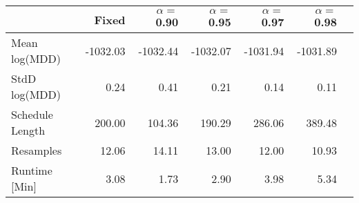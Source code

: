 \begin{tabular} {lrrrrrr} 
 \hline \hline 
&Fixed&$\alpha = $0.90&$\alpha = $0.95&$\alpha = $0.97&$\alpha = $0.98\\ 
 \hline 
Mean log(MDD)&-1032.03&-1032.44&-1032.07&-1031.94&-1031.89\\ 
StdD log(MDD)&0.24&0.41&0.21&0.14&0.11\\ 
Schedule Length&200.00&104.36&190.29&286.06&389.48\\ 
Resamples&12.06&14.11&13.00&12.00&10.93\\ 
Runtime [Min]&3.08&1.73&2.90&3.98&5.34\\ 
\hline 
\end{tabular}